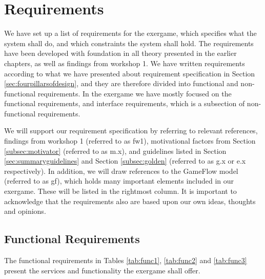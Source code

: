\section{Requirements}
\label{sec:req}
We have set up a list of requirements for the exergame, which specifies what the system shall do, and which constraints the system shall hold. The requirements have been developed with foundation in all theory presented in the earlier chapters, as well as findings from workshop 1. We have written requirements according to what we have presented about requirement specification in Section \ref{sec:fourpillarsofdesign}, and they are therefore divided into functional and non-functional requirements. In the exergame we have mostly focused on the functional requirements, and interface requirements, which is a subsection of non-functional requirements. 

We will support our requirement specification by referring to relevant references, findings from workshop 1 (referred to as fw1), motivational factors from Section \ref{subsec:motivator} (referred to as m.x), and guidelines listed in Section \ref{sec:summaryguidelines} and Section \ref{subsec:golden} (referred to as g.x or e.x respectively). In addition, we will draw references to the GameFlow model \cite{sweetser} (referred to as gf), which holds many important elements included in our exergame. These will be listed in the rightmost column. It is important to acknowledge that the requirements also are based upon our own ideas, thoughts and opinions. 

\subsection{Functional Requirements}
The functional requirements in Tables \ref{tab:func1}, \ref{tab:func2} and \ref{tab:func3} present the services and functionality the exergame shall offer.

